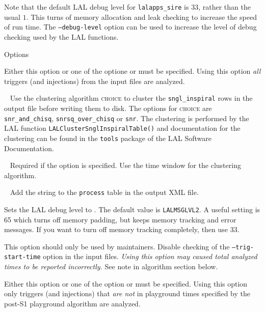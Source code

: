 \begin{entry}
Note that the default LAL debug level for \verb$lalapps_sire$ is $33$, rather
than the usual $1$. This turns of memory allocation and leak checking to
increase the speed of run time. The \texttt{--debug-level} option can be used
to increase the level of debug checking used by the LAL functions.

\item[Options]\leavevmode
\begin{entry}
\item[ \option{--all-data}]
Either this option or one of the optione  or  must be specified.
Using this option \emph{all} triggers (and injections) from the input files are analyzed.

\item[\option{--cluster-algorithm}~\parm{choice}]
 Use the clustering algorithm \textsc{choice} to cluster the \verb$sngl_inspiral$ rows
in the output file before writing them to disk. The options for
\textsc{choice} are \verb$snr_and_chisq$, \verb$snrsq_over_chisq$ or
\verb$snr$. The clustering is performed by the LAL function
\verb$LALClusterSnglInspiralTable()$ and documentation for the clustering can
be found in the \texttt{tools} package of the LAL Software Documentation.

\item[ \option{--cluster-time}~\parm{t}]
Required if the  option is specified. Use the time window
 for the clustering algorithm.

\item[ \option{--comment}~\parm{string}]
Add the string  to the \verb$process$ table in the output XML file.

\item[\option{--debug-level} \parm{level}]
Sets the LAL debug level to .  The default value is
\texttt{LALMSGLVL2}.  A useful setting is 65 which turns off memory
padding, but keeps memory tracking and error messages.  If you want to turn
off memory tracking completely, then use 33.

\item[\option{--disable-trig-start-time} ]
This option should only be used by
maintainers. Disable checking of the \texttt{--trig-start-time} option in the
input files. \emph{Using this option may caused total analyzed times to be
reported incorrectly.} See note in algorithm section below.

\item[ \option{--exclude-playground}]
Either this option or one of the option  or  must be specified.
Using this option only triggers (and injections) that \emph{are not} in playground times specified by the post-S1 playground algorithm are analyzed.


\end{entry}
\end{entry}
